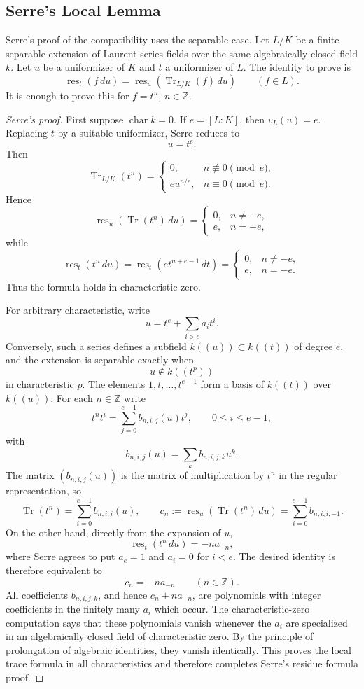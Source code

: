 \documentclass[11pt,a4paper]{article}
\newcommand{\res}{\operatorname{res}}
\newcommand{\Tr}{\operatorname{Tr}}
\theoremstyle{definition}
\theoremstyle{plain}
\theoremstyle{remark}
\begin{document}
\subsection{Serre's Local Lemma}

Serre's proof of the compatibility uses the separable case.  Let $L/K$ be a finite separable extension of Laurent-series fields over the same algebraically closed field $k$.  Let $u$ be a uniformizer of $K$ and $t$ a uniformizer of $L$.  The identity to prove is
\[
  \res_t(f\,du)=\res_u(\Tr_{L/K}(f)\,du)
  \qquad(f\in L).
\]
It is enough to prove this for $f=t^n$, $n\in\mathbb Z$.

\begin{proof}[Serre's proof]
First suppose $\operatorname{char}k=0$.  If $e=[L:K]$, then $v_L(u)=e$.  Replacing $t$ by a suitable uniformizer, Serre reduces to
\[
  u=t^e.
\]
Then
\[
  \Tr_{L/K}(t^n)=
  \begin{cases}
    0, & n\not\equiv0\pmod e,\\
    e u^{n/e}, & n\equiv0\pmod e.
  \end{cases}
\]
Hence
\[
  \res_u(\Tr(t^n)\,du)=
  \begin{cases}
    0, & n\ne -e,\\
    e, & n=-e,
  \end{cases}
\]
while
\[
  \res_t(t^n\,du)=\res_t(e t^{n+e-1}\,dt)=
  \begin{cases}
    0, & n\ne -e,\\
    e, & n=-e.
  \end{cases}
\]
Thus the formula holds in characteristic zero.

For arbitrary characteristic, write
\[
  u=t^e+\sum_{i>e}a_i t^i.
\]
Conversely, such a series defines a subfield $k((u))\subset k((t))$ of degree $e$, and the extension is separable exactly when
\[
  u\notin k((t^p))
\]
in characteristic $p$.  The elements $1,t,\ldots,t^{e-1}$ form a basis of $k((t))$ over $k((u))$.  For each $n\in\mathbb Z$ write
\[
  t^n t^i=\sum_{j=0}^{e-1} b_{n,i,j}(u)t^j,
  \qquad 0\le i\le e-1,
\]
with
\[
  b_{n,i,j}(u)=\sum_k b_{n,i,j,k}u^k.
\]
The matrix $(b_{n,i,j}(u))$ is the matrix of multiplication by $t^n$ in the regular representation, so
\[
  \Tr(t^n)=\sum_{i=0}^{e-1}b_{n,i,i}(u),
  \qquad
  c_n:=\res_u(\Tr(t^n)\,du)=\sum_{i=0}^{e-1}b_{n,i,i,-1}.
\]
On the other hand, directly from the expansion of $u$,
\[
  \res_t(t^n\,du)=-n a_{-n},
\]
where Serre agrees to put $a_e=1$ and $a_i=0$ for $i<e$.  The desired identity is therefore equivalent to
\[
  c_n=-n a_{-n}
  \qquad(n\in\mathbb Z).
\]
All coefficients $b_{n,i,j,k}$, and hence $c_n+n a_{-n}$, are polynomials with integer coefficients in the finitely many $a_i$ which occur.  The characteristic-zero computation says that these polynomials vanish whenever the $a_i$ are specialized in an algebraically closed field of characteristic zero.  By the principle of prolongation of algebraic identities, they vanish identically.  This proves the local trace formula in all characteristics and therefore completes Serre's residue formula proof.
\end{proof}
\end{document}

